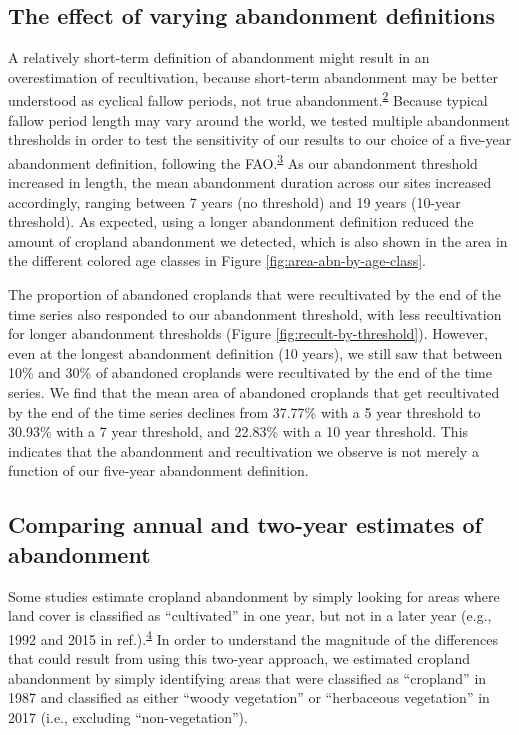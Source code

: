 \documentclass[
]{article}
\begin{document}
\hypertarget{abn-thresholds}{%
\subsection{The effect of varying abandonment definitions}\label{abn-thresholds}}

A relatively short-term definition of abandonment might result in an overestimation of recultivation, because short-term abandonment may be better understood as cyclical fallow periods, not true abandonment.\textsuperscript{\protect\hyperlink{ref-Munroe2013}{2}}
Because typical fallow period length may vary around the world, we tested multiple abandonment thresholds in order to test the sensitivity of our results to our choice of a five-year abandonment definition, following the FAO.\textsuperscript{\protect\hyperlink{ref-FAO2016}{3}}
As our abandonment threshold increased in length, the mean abandonment duration across our sites increased accordingly, ranging between 7 years (no threshold) and 19 years (10-year threshold).
As expected, using a longer abandonment definition reduced the amount of cropland abandonment we detected, which is also shown in the area in the different colored age classes in Figure \ref{fig:area-abn-by-age-class}.

The proportion of abandoned croplands that were recultivated by the end of the time series also responded to our abandonment threshold, with less recultivation for longer abandonment thresholds (Figure \ref{fig:recult-by-threshold}).
However, even at the longest abandonment definition (10 years), we still saw that between 10\% and 30\% of abandoned croplands were recultivated by the end of the time series.
We find that the mean area of abandoned croplands that get recultivated by the end of the time series declines from 37.77\% with a 5 year threshold to 30.93\% with a 7 year threshold, and 22.83\% with a 10 year threshold.
This indicates that the abandonment and recultivation we observe is not merely a function of our five-year abandonment definition.

\hypertarget{twoyr-vs-annual}{%
\subsection{Comparing annual and two-year estimates of abandonment}\label{twoyr-vs-annual}}

Some studies estimate cropland abandonment by simply looking for areas where land cover is classified as ``cultivated'' in one year, but not in a later year (e.g., 1992 and 2015 in ref.).\textsuperscript{\protect\hyperlink{ref-Naess2021}{4}}
In order to understand the magnitude of the differences that could result from using this two-year approach, we estimated cropland abandonment by simply identifying areas that were classified as ``cropland'' in 1987 and classified as either ``woody vegetation'' or ``herbaceous vegetation'' in 2017 (i.e., excluding ``non-vegetation'').
\end{document}
